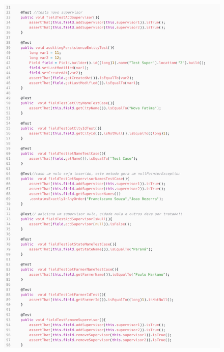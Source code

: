 \begin{figure}[H]
	\centering
	\includegraphics[scale=0.18]{dados/figuras/carbonField1.png}
\end{figure}

